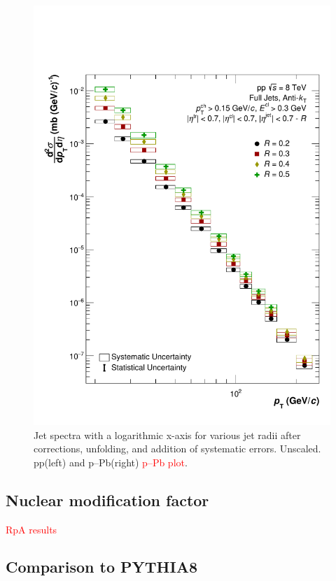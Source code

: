 \documentclass[ALICE]{ALICE_analysis_notes}
\newcommand{\pPb}{{\mbox{p--Pb}}\xspace}
\newcommand{\pp}{pp\xspace}
\begin{document}
\begin{figure}
    \centering
    \includegraphics[width=15cm]{figures/FinalResults/Bayes_reg6_logx_unscaled.pdf}
    \caption{Jet spectra with a logarithmic x-axis for various jet radii after corrections, unfolding, and addition of systematic errors. Unscaled. \pp (left) and \pPb (right) \textcolor{red}{\pPb plot}.}
    \label{fig:finalSpectraUnscaledLogX}
\end{figure}

\subsection{Nuclear modification factor}
\label{sec:resultsRpA}

\textcolor{red}{RpA results}

\subsection{Comparison to PYTHIA8}
\label{sec:mcComparison}
\end{document}
